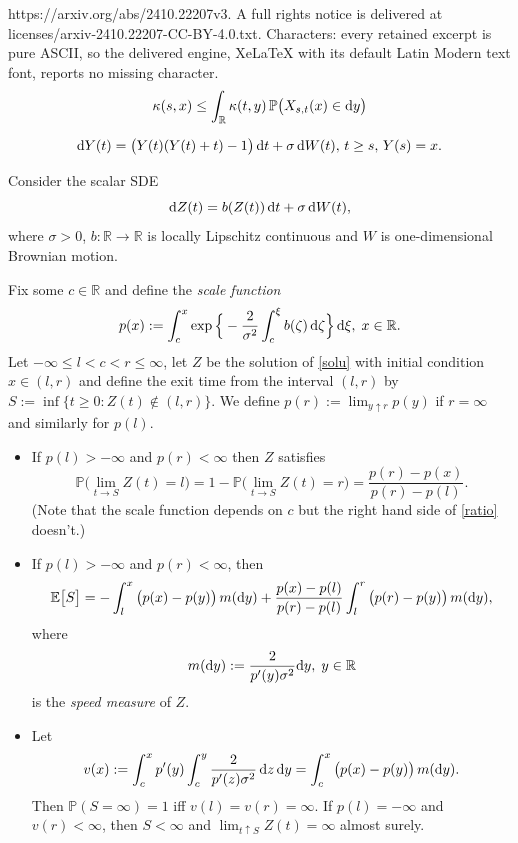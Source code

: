 \documentclass[10pt,a4paper]{amsart}
\def\E{\mathbb E}
\def\P{\mathbb P}
\def\R{\mathbb R}
\renewcommand{\d}{\hbox{d}}
\begin{document}
https://arxiv.org/abs/2410.22207v3. A full rights notice is delivered at licenses/arxiv-2410.22207-CC-BY-4.0.txt. Characters: every retained excerpt is pure ASCII, so the delivered engine, XeLaTeX with its default Latin Modern text font, reports no missing character.
      \begin{equation}\label{kappe}
\kappa(s,x)\leq\int_\R \kappa(t,y)\,\P\big(X_{s,t}(x)\in\d y\big)
\end{equation}

\begin{equation}\label{why}
\d Y(t)=\big(Y(t) (Y(t) +t)-1     \big)\,\d t +\sigma\,\d W(t), \,t\geq s,\,Y(s)=x.
\end{equation}

\begin{lem}\label{1ddiff}
  Consider the scalar SDE
  \begin{equation}\label{solu}
\d Z(t) = b(Z(t))\, \d t + \sigma \,\d W(t), 
\end{equation}
where $\sigma>0$, $b:\R \to \R$ is locally Lipschitz continuous and $W$ is one-dimensional Brownian motion.
 
Fix some $c \in \R$ and define the {\em scale function}
$$
p(x):=\int_c^x\exp\Big\{ -\frac 2{\sigma^2}\int_c^\xi b(\zeta)\,\d \zeta\Big\}\,\d \xi,\;x \in \R.
$$
Let $-\infty\leq l < c<r \leq \infty$, let $Z$ be  the solution of \eqref{solu} with initial condition $x \in (l,r)$ and define  the exit time from the interval $(l,r)$ by $S:=\inf\{t \geq 0: Z(t) \notin (l,r)\}$. We define $p(r):=\lim_{y \uparrow r}p(y)$ if $r=\infty$ and similarly for $p(l)$. 
\begin{itemize}
\item [a)] If $p(l)>-\infty$ and $p(r)<\infty$ then $Z$ satisfies 
\begin{equation}\label{ratio}
\P\Big(\lim_{t \to S}Z(t)=l    \Big)=1-\P\Big(\lim_{t \to S}Z(t)=r    \Big)=\frac{p(r)-p(x)}{p(r)-p(l)}.
\end{equation}
(Note that the scale function depends on $c$ but the right hand side of \eqref{ratio} doesn't.)

\item[b)] If $p(l)>-\infty$ and $p(r)<\infty$, then
$$
\E\big[S\big]= -\int_l^x\big(p(x)-p(y)\big)\,m(\d y)+  \frac{p(x)-p(l)}{p(r)-p(l)}\int_l^r\big(p(r)-p(y)\big)\,m(\d y),
$$
where
$$
m(\d y):=\frac 2{p'(y)\sigma^2}\d y,\;y\in \R
$$
is the {\em speed measure} of $Z$.
\item[c)]
  Let
  $$
v(x):=\int_c^xp'(y)\int_c^y\frac 2{p'(z)\sigma^2}\,\d z\,\d y=\int_c^x\big(p(x)-p(y)\big)\,m(\d y).
$$
Then $\P (S=\infty)=1$ iff $v(l)=v(r)=\infty$. If $p(l)=-\infty$ and $v(r)<\infty$, then $S<\infty$ and $\lim_{t \uparrow S}Z(t)=\infty$ almost surely.  
  \end{itemize}
\end{lem}
\end{document}
